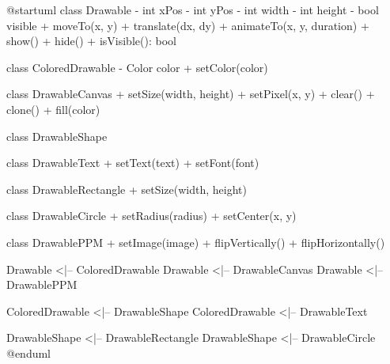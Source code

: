 @startuml
class Drawable {
  - int xPos
  - int yPos
  - int width
  - int height
  - bool visible
  + moveTo(x, y)
  + translate(dx, dy)
  + animateTo(x, y, duration)
  + show()
  + hide()
  + isVisible(): bool
}

class ColoredDrawable {
  - Color color
  + setColor(color)
}

class DrawableCanvas {
  + setSize(width, height)
  + setPixel(x, y)
  + clear()
  + clone()
  + fill(color)
}

class DrawableShape {
}

class DrawableText {
  + setText(text)
  + setFont(font)
}

class DrawableRectangle {
  + setSize(width, height)
}

class DrawableCircle {
  + setRadius(radius)
  + setCenter(x, y)
}

class DrawablePPM {
  + setImage(image)
  + flipVertically()
  + flipHorizontally()
}

Drawable <|-- ColoredDrawable
Drawable <|-- DrawableCanvas
Drawable <|-- DrawablePPM

ColoredDrawable <|-- DrawableShape
ColoredDrawable <|-- DrawableText

DrawableShape <|-- DrawableRectangle
DrawableShape <|-- DrawableCircle
@enduml
